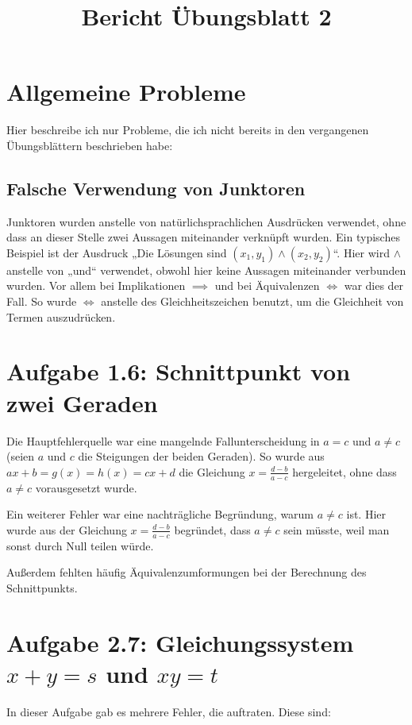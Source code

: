 \documentclass[a4paper]{article}
\title{Bericht Übungsblatt 2}
\date{}
\begin{document}
\maketitle

\section{Allgemeine Probleme}

Hier beschreibe ich nur Probleme, die ich nicht bereits in den vergangenen Übungsblättern beschrieben habe:

\subsection{Falsche Verwendung von Junktoren}

Junktoren wurden anstelle von natürlichsprachlichen Ausdrücken verwendet, ohne dass an dieser Stelle zwei Aussagen miteinander verknüpft wurden. Ein typisches Beispiel ist der Ausdruck „Die Lösungen sind $(x_1,y_1) \land (x_2,y_2)$“. Hier wird $\land$ anstelle von „und“ verwendet, obwohl hier keine Aussagen miteinander verbunden wurden. Vor allem bei Implikationen $\implies$ und bei Äquivalenzen $\iff$ war dies der Fall. So wurde $\iff$ anstelle des Gleichheitszeichen benutzt, um die Gleichheit von Termen auszudrücken.

\section{Aufgabe 1.6: Schnittpunkt von zwei Geraden}

Die Hauptfehlerquelle war eine mangelnde Fallunterscheidung in $a=c$ und $a\neq c$ (seien $a$ und $c$ die Steigungen der beiden Geraden). So wurde aus $ax+b=g(x)=h(x)=cx+d$ die Gleichung $x=\frac{d-b}{a-c}$ hergeleitet, ohne dass $a\neq c$ vorausgesetzt wurde.

Ein weiterer Fehler war eine nachträgliche Begründung, warum $a\neq c$ ist. Hier wurde aus der Gleichung $x=\frac{d-b}{a-c}$ begründet, dass $a\neq c$ sein müsste, weil man sonst durch Null teilen würde.

Außerdem fehlten häufig Äquivalenzumformungen bei der Berechnung des Schnittpunkts.

\section{Aufgabe 2.7: Gleichungssystem $x+y=s$ und $xy=t$}

In dieser Aufgabe gab es mehrere Fehler, die auftraten. Diese sind:
\end{document}
